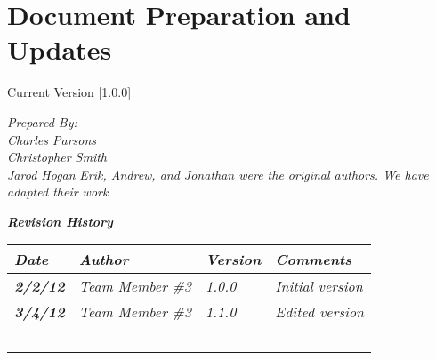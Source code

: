 
\chapter{Document Preparation and Updates}

Current Version [1.0.0]
\vspace*{5mm}

{\color{MSBlue3}
\noindent
\textit{Prepared By:}\\
\textit{Charles Parsons}\\
\textit{Christopher Smith}\\
\textit{Jarod Hogan}
\textit{Erik, Andrew, and Jonathan were the original authors. We have adapted their work}\\
}

\vfill
\noindent
{\color{color02} \textit{\textbf{Revision History}}}\\
\begin{tabular}{|>{\raggedright}p{1.5cm}|>{\raggedright}p{3cm}|>{\raggedright}p{1.5cm}|>{\raggedright}p{9cm}|}
\hline
\textit{\textbf{Date}} &  \textit{\textbf{Author}} & \textit{\textbf{Version}} & \textit{\textbf{Comments}}\tabularnewline
\hline
 \textit{\textbf{2/2/12}} & \textit{Team Member \#3} & \textit{1.0.0} & \textit{Initial version}\tabularnewline
\hline
\textit{\textbf{3/4/12}} & \textit{Team Member \#3} & \textit{1.1.0} & \textit{Edited version}\tabularnewline
\hline
 &  &  & \tabularnewline
 \hline
 &  &  & \tabularnewline
\hline
 &  &  & \tabularnewline
\hline
 &  &  & \tabularnewline
\hline
 &  &  & \tabularnewline
\hline
\end{tabular}
\vfill

